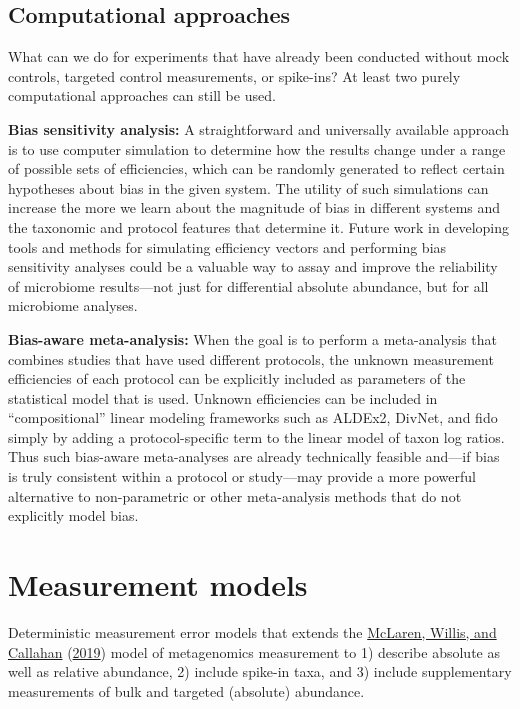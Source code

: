 \documentclass[
]{article}
\theoremstyle{definition}
\theoremstyle{definition}
\theoremstyle{definition}
\theoremstyle{definition}
\theoremstyle{remark}
\begin{document}
\hypertarget{computational-approaches}{%
\subsection{Computational approaches}\label{computational-approaches}}

What can we do for experiments that have already been conducted without mock controls, targeted control measurements, or spike-ins?
At least two purely computational approaches can still be used.

\textbf{Bias sensitivity analysis:}
A straightforward and universally available approach is to use computer simulation to determine how the results change under a range of possible sets of efficiencies, which can be randomly generated to reflect certain hypotheses about bias in the given system.
The utility of such simulations can increase the more we learn about the magnitude of bias in different systems and the taxonomic and protocol features that determine it.
Future work in developing tools and methods for simulating efficiency vectors and performing bias sensitivity analyses could be a valuable way to assay and improve the reliability of microbiome results---not just for differential absolute abundance, but for all microbiome analyses.

\textbf{Bias-aware meta-analysis:}
When the goal is to perform a meta-analysis that combines studies that have used different protocols, the unknown measurement efficiencies of each protocol can be explicitly included as parameters of the statistical model that is used.
Unknown efficiencies can be included in ``compositional'' linear modeling frameworks such as ALDEx2, DivNet, and fido simply by adding a protocol-specific term to the linear model of taxon log ratios.
Thus such bias-aware meta-analyses are already technically feasible and---if bias is truly consistent within a protocol or study---may provide a more powerful alternative to non-parametric or other meta-analysis methods that do not explicitly model bias.

\hypertarget{appendix-appendix}{%
\appendix {}}


\hypertarget{models}{%
\section{Measurement models}\label{models}}

Deterministic measurement error models that extends the \protect\hyperlink{ref-mclaren2019cons}{McLaren, Willis, and Callahan} (\protect\hyperlink{ref-mclaren2019cons}{2019}) model of metagenomics measurement to 1) describe absolute as well as relative abundance, 2) include spike-in taxa, and 3) include supplementary measurements of bulk and targeted (absolute) abundance.
\end{document}
